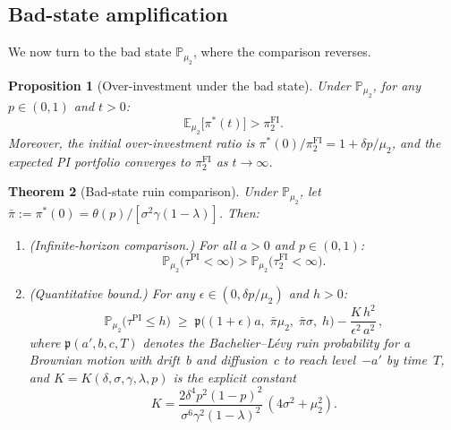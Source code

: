\documentclass[12pt]{article}
\newtheorem{theorem}{Theorem}[section]
\newtheorem{proposition}[theorem]{Proposition}
\theoremstyle{remark}
\theoremstyle{definition}
\newcommand{\E}{\mathbb{E}}
\newcommand{\Prob}{\mathbb{P}}
\newcommand{\FI}{\mathrm{FI}}
\newcommand{\PI}{\mathrm{PI}}
\begin{document}
\subsection{Bad-state amplification}
\label{sec:bad_state}

We now turn to the bad state $\Prob_{\mu_2}$, where the comparison
reverses.

\begin{proposition}[Over-investment under the bad state]
\label{prop:over_invest}
Under $\Prob_{\mu_2}$, for any $p \in (0,1)$ and $t > 0$:
\begin{equation}\label{eq:over_invest_exp}
  \E_{\mu_2}\bigl[\pi^*(t)\bigr] > \pi_2^{\FI}.
\end{equation}
Moreover, the initial over-investment ratio is
$\pi^*(0)/\pi_2^{\FI} = 1 + \delta p/\mu_2$, and the expected PI
portfolio converges to $\pi_2^{\FI}$ as $t \to \infty$.
\end{proposition}

\begin{theorem}[Bad-state ruin comparison]
\label{thm:bad_state}
Under $\Prob_{\mu_2}$, let
$\bar{\pi} := \pi^*(0) = \theta(p)/[\sigma^2\gamma(1-\lambda)]$.
Then:

\begin{enumerate}[label=(\roman*)]
\item (Infinite-horizon comparison.)
  For all $a > 0$ and $p \in (0,1)$:
  \begin{equation}\label{eq:bad_inf}
    \Prob_{\mu_2}\bigl(\tau^{\PI} < \infty\bigr)
    > \Prob_{\mu_2}\bigl(\tau_2^{\FI} < \infty\bigr).
  \end{equation}

\item (Quantitative bound.)
  For any $\epsilon \in (0, \delta p/\mu_2)$ and $h > 0$:
  \begin{equation}\label{eq:bad_quant}
    \Prob_{\mu_2}\bigl(\tau^{\PI} \le h\bigr)
    \;\ge\;
    \mathfrak{p}\!\bigl((1+\epsilon)a,\; \bar{\pi}\mu_2,\;
      \bar{\pi}\sigma,\; h\bigr)
    - \frac{K\,h^2}{\epsilon^2\,a^2}\,,
  \end{equation}
  where $\mathfrak{p}(a', b, c, T)$ denotes the Bachelier--L\'evy ruin
  probability for a Brownian motion with drift~$b$ and diffusion~$c$
  to reach level~$-a'$ by time~$T$, and
  $K = K(\delta, \sigma, \gamma, \lambda, p)$ is the explicit constant
  \begin{equation}\label{eq:K_constant}
    K = \frac{2\delta^4 p^2(1-p)^2}{\sigma^6\gamma^2(1-\lambda)^2}\,
    (4\sigma^2 + \mu_2^2).
  \end{equation}
\end{enumerate}
\end{theorem}
\end{document}
